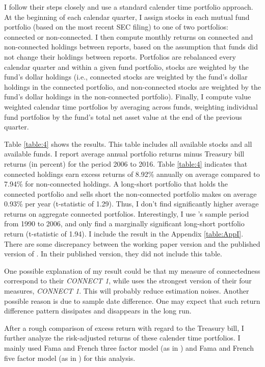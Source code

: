 \documentclass[11pt]{article}
\begin{document}
\begin{doublespace}
I follow their steps closely and use a standard calender time portfolio approach. At the beginning of each calendar quarter, I assign stocks in each mutual fund portfolio (based on the most recent SEC filing) to one of two portfolios: connected or non-connected. I then compute monthly returns on connected and non-connected holdings between reports, based on the assumption that funds did not change their holdings between reports. Portfolios are rebalanced every calendar quarter and within a given fund portfolio, stocks are weighted by the fund’s dollar holdings (i.e., connected stocks are weighted by the fund’s dollar holdings in the connected portfolio, and non-connected stocks are weighted by the fund’s dollar holdings in the non-connected portfolio). Finally, I compute value weighted calendar time portfolios by averaging across funds, weighting individual fund portfolios by the fund’s total net asset value at the end of the previous quarter. 

Table \ref{table:4} shows the results. This table includes all available stocks
and all available funds. I report average annual portfolio returns minus Treasury bill
returns (in percent) for the period 2006 to 2016. Table \ref{table:4} indicates that connected holdings earn excess returns of 8.92\% annually on average compared to 7.94\% for non-connected holdings. A long-short portfolio that
holds the connected portfolio and sells short the non-connected portfolio makes on
average 0.93\% per year (t-statistic of 1.29). Thus, I don't find significantly higher average returns on aggregate connected portfolios. Interestingly, I use \cite{cohen2008small}'s sample period from 1990 to 2006, and only find a marginally significant long-short portfolio return (t-statistic of 1.94). I include the result in the Appendix \ref{table:AppI}. There are some discrepancy between the working paper version and the published version of \cite{cohen2008small}. In their published version, they did not include this table.  

One possible explanation of my result could be that my measure of connectedness correspond to their \emph{CONNECT 1}, while \cite{cohen2008small} uses the strongest version of their four measures, \emph{CONNECT 1}. This will probably reduce estimation noises. Another possible reason is due to sample date difference. One may expect that such return difference pattern dissipates and disappears in the long run.

After a rough comparison of excess return with regard to the Treasury bill, I further analyze the risk-adjusted returns of these calender time portfolios. I mainly used Fama and French three factor model (as in \cite{fama1993common} ) and Fama and French five factor model (as in \cite{fama2016dissecting}) for this analysis. 


\end{doublespace}
\end{document}
